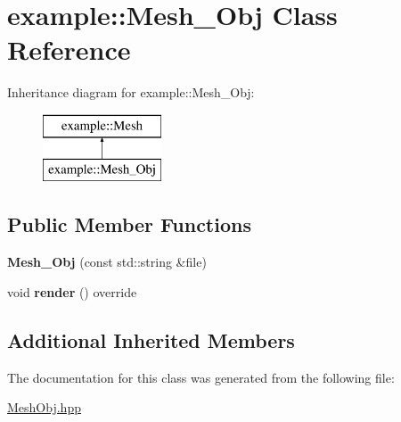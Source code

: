 \hypertarget{classexample_1_1_mesh___obj}{}\section{example\+::Mesh\+\_\+\+Obj Class Reference}
\label{classexample_1_1_mesh___obj}
Inheritance diagram for example\+::Mesh\+\_\+\+Obj\+:\begin{figure}[H]
\begin{center}
\leavevmode
\includegraphics[height=2.000000cm]{classexample_1_1_mesh___obj}
\end{center}
\end{figure}
\subsection*{Public Member Functions}
\begin{DoxyCompactItemize}
\item 
\mbox{\label{classexample_1_1_mesh___obj_a55abaeca241c0fe341620fcb13fc488a}} 
{\bfseries Mesh\+\_\+\+Obj} (const std\+::string \&file)
\item 
\mbox{\label{classexample_1_1_mesh___obj_aef604941d98d6a10954924b1ef8a3170}} 
void {\bfseries render} () override
\end{DoxyCompactItemize}
\subsection*{Additional Inherited Members}


The documentation for this class was generated from the following file\+:\begin{DoxyCompactItemize}
\item 
\mbox{\hyperlink{_mesh_obj_8hpp}{Mesh\+Obj.\+hpp}}\end{DoxyCompactItemize}
